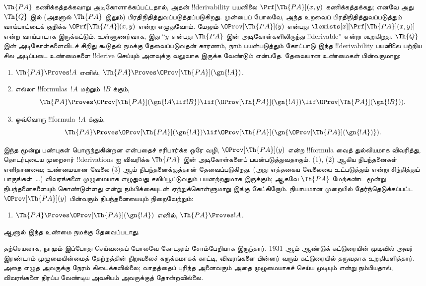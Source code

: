 \documentclass[../../../include/open-logic-section]{subfiles}
\begin{document}
$\Th{PA}$ கணிக்கத்தக்கவாறு அடிகோளாக்கப்பட்டதால், அதன்
!!{derivability} பயனிலை $\Prf[\Th{PA}](x,y)$ கணிக்கத்தக்கது; எனவே அது
$\Th{Q}$ இல் (அதனால் $\Th{PA}$ இலும்) பிரதிநிதித்துவப்படுத்தப்படுகிறது.
முன்பைப் போலவே, அந்த உறவைப் பிரதிநிதித்துவப்படுத்தும் வாய்பாட்டைக்
குறிக்க $\OPrf[\Th{PA}](x,y)$ என்று எழுதுவோம். மேலும்
$\OProv[\Th{PA}](y)$ என்பது
$\lexists[x][\Prf[\Th{PA}](x,y)]$ என்ற வாய்பாடாக இருக்கட்டும்.
உள்ளுணர்வாக, இது “$y$ என்பது $\Th{PA}$ இன் அடிகோள்களிலிருந்து
!!{derivable}” என்று கூறுகிறது. $\Th{Q}$ இன் அடிகோள்களைவிடச் சிறிது
கூடுதல் நமக்கு தேவைப்படுவதன் காரணம், நாம் பயன்படுத்தும் கோட்பாடு இந்த
!!{derivability} பயனிலை பற்றிய சில அடிப்படை உண்மைகளை !!{derive}
செய்யும் அளவுக்கு வலுவாக இருக்க வேண்டும் என்பதே. தேவையான உண்மைகள்
பின்வருமாறு:
\begin{enumerate}
\item[P1.] $\Th{PA} \Proves !A$ எனில்,
  $\Th{PA} \Proves \OProv[\Th{PA}](\gn{!A})$.
\item[P2.] எல்லா !!{formula}s~$!A$ மற்றும்~$!B$ க்கும்,
  \[
  \Th{PA} \Proves \OProv[\Th{PA}](\gn{!A \lif !B}) \lif
  (\OProv[\Th{PA}](\gn{!A}) \lif \OProv[\Th{PA}](\gn{!B})).
  \]
\item[P3.] ஒவ்வொரு !!{formula}~$!A$ க்கும்,
  \[
  \Th{PA} \Proves \OProv[\Th{PA}](\gn{!A})
  \lif \OProv[\Th{PA}](\gn{\OProv[\Th{PA}](\gn{!A})}).
  \]
\end{enumerate}
இந்த மூன்று பண்புகள் பொருந்துகின்றன என்பதைச் சரிபார்க்க ஒரே வழி,
$\OProv[\Th{PA}](y)$ என்ற !!{formula} வைத் துல்லியமாக விவரித்து,
தொடர்புடைய முறைசார் !!{derivation}s ஐ விவரிக்க $\Th{PA}$ இன்
அடிகோள்களைப் பயன்படுத்துவதாகும். (1), (2) ஆகிய நிபந்தனைகள் எளிதானவை;
உண்மையான வேலை (3) ஆம் நிபந்தனைக்குத்தான் தேவைப்படுகிறது. (அது
எத்தகைய வேலையை உட்படுத்தும் என்று சிந்தித்துப் பாருங்கள்~\dots)
விவரங்களை முழுமையாக எழுதுவது சலிப்பூட்டுவதும் பயனற்றதுமாக இருக்கும்;
ஆகவே $\Th{PA}$ மேற்கண்ட மூன்று நிபந்தனைகளையும் கொண்டுள்ளது என்று
நம்பிக்கையுடன் ஏற்றுக்கொள்ளுமாறு இங்கு கேட்கிறோம். நியாயமான முறையில்
தேர்ந்தெடுக்கப்பட்ட $\OProv[\Th{PA}](y)$ பின்வரும் நிபந்தனையையும்
நிறைவேற்றும்:
\begin{enumerate}
\item[P4.] $\Th{PA} \Proves \OProv[\Th{PA}](\gn{!A})$ எனில்,
  $\Th{PA} \Proves !A$.
\end{enumerate}
ஆனால் இந்த உண்மை நமக்கு தேவைப்படாது.

\begin{digress}
தற்செயலாக, நாமும் இப்போது செய்வதைப் போலவே கோடலும் சோம்பேறியாக
இருந்தார். 1931 ஆம் ஆண்டுக் கட்டுரையின் முடிவில் அவர் இரண்டாம்
முழுமையின்மைத் தேற்றத்தின் நிறுவலைச் சுருக்கமாகக் காட்டி, விவரங்களை
பின்னர் வரும் கட்டுரையில் தருவதாக உறுதியளித்தார். அதை எழுத அவருக்கு
நேரம் கிடைக்கவில்லை; வாதத்தைப் புரிந்த அனைவரும் அதை முழுமையாகச்
செய்ய முடியும் என்று நம்பியதால், விவரங்களை நிரப்ப வேண்டிய அவசியம்
அவருக்குத் தோன்றவில்லை.
\end{digress}
\end{document}
